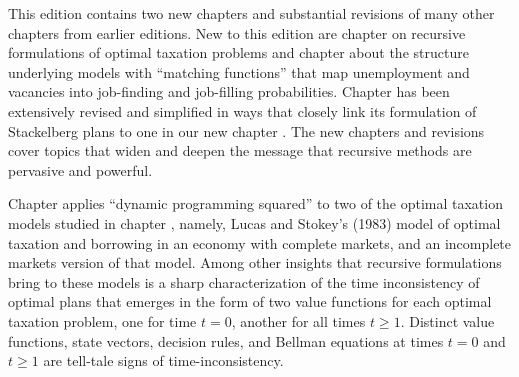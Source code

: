  \noindent
This edition
contains two  new chapters and substantial revisions of many
other chapters from earlier editions. 
 New to this edition
are chapter
 on recursive formulations of optimal taxation problems and chapter
about the structure underlying models with ``matching functions'' that map unemployment and vacancies into
job-finding and job-filling probabilities. Chapter  has been extensively revised and simplified in ways
that closely link its formulation of Stackelberg plans   to  one in our  new chapter .
The new chapters and  revisions cover   topics that
 widen and deepen
the message that recursive methods are pervasive and powerful.


\noindent
Chapter  applies ``dynamic programming squared''  to two of the optimal taxation models studied in
chapter , namely, Lucas and Stokey's (1983) model of optimal taxation and borrowing in an economy with complete markets, and
an incomplete markets version of that model. Among other insights that  recursive formulations bring to  these models is a sharp
characterization of the time inconsistency of optimal plans that emerges in the form of two value functions for each optimal taxation problem,
one for time $t=0$, another for all times $t \geq 1$. Distinct value functions, state vectors,  decision rules,  and  Bellman equations at times $t=0$  and $t \geq 1$
are tell-tale signs of time-inconsistency.

